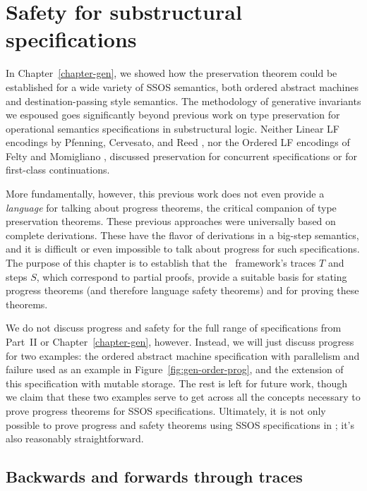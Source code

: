 \chapter{Safety for substructural specifications}
\label{chapter-safety}

In Chapter~\ref{chapter-gen}, we showed how the preservation theorem
could be established for a wide variety of SSOS semantics, both
ordered abstract machines and destination-passing style semantics.
The methodology of generative invariants we espoused goes
significantly beyond previous work on type preservation for
operational semantics specifications in substructural logic.  Neither
Linear LF encodings by Pfenning, Cervesato, and Reed
\cite{cervesato02linear,reed09hybrid}, nor the Ordered LF encodings of
Felty and Momigliano \cite{felty12hybrid}, discussed preservation for
concurrent specifications or for first-class continuations. 

More fundamentally, however, this previous work does not even provide
a {\it language} for talking about progress theorems, the critical
companion of type preservation theorems.  These previous approaches
were universally based on complete derivations. These have the flavor
of derivations in a big-step semantics, and it is difficult or even
impossible to talk about progress for such specifications. The purpose
of this chapter is to establish that the \sls~framework's traces $T$
and steps $S$, which correspond to partial proofs, provide a suitable
basis for stating progress theorems (and therefore language safety
theorems) and for proving these theorems.

We do not discuss progress and safety for the full range of
specifications from Part~II or Chapter~\ref{chapter-gen},
however. Instead, we will just discuss progress for two examples: the
ordered abstract machine specification with parallelism and failure
used as an example in Figure~\ref{fig:gen-order-prog}, and the
extension of this specification with mutable storage. The rest is left
for future work, though we claim that these two examples serve to get
across all the concepts necessary to prove progress theorems for SSOS
specifications. Ultimately, it is not only possible to prove progress
and safety theorems using SSOS specifications in \sls; it's also
reasonably straightforward.

\section{Backwards and forwards through traces}


